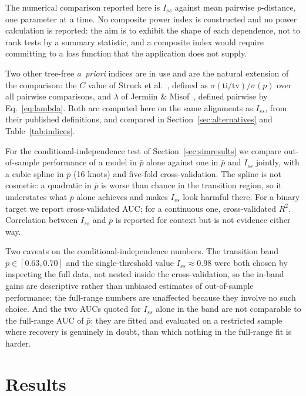 \documentclass[preprint,12pt,authoryear]{elsarticle}
\newcommand{\Iss}{I_{ss}}
\theoremstyle{definition}
\theoremstyle{remark}
\begin{document}
The numerical comparison reported here is $\Iss$ against mean pairwise
$p$-distance, one parameter at a time. No composite power index is
constructed and no power calculation is reported: the aim is to exhibit the
shape of each dependence, not to rank tests by a summary statistic, and a
composite index would require committing to a loss function that the
application does not supply.

Two other tree-free \emph{a~priori} indices are in use and are the natural
extension of the comparison: the $C$ value of
Struck et al.~\citep{struck2008cfactor}, defined as
$\sigma(\mathrm{ti/tv})/\sigma(p)$ over all pairwise comparisons, and
$\lambda$ of Jermiin \& Misof~\citep{jermiin2020signal}, defined pairwise by
Eq.~\eqref{eq:lambda}. Both are computed here on the same alignments as
$\Iss$, from their published definitions, and compared in
Section~\ref{sec:alternatives} and Table~\ref{tab:indices}.

For the conditional-independence test of Section~\ref{sec:simresults} we
compare out-of-sample performance of a model in $\bar p$ alone against one in
$\bar p$ and $\Iss$ jointly, with a cubic spline in $\bar p$ (16 knots) and
five-fold cross-validation. The spline is not cosmetic: a quadratic in
$\bar p$ is worse than chance in the transition region, so it understates what
$\bar p$ alone achieves and makes $\Iss$ look harmful there. For a binary
target we report cross-validated AUC; for a continuous one, cross-validated
$R^2$. Correlation between $\Iss$ and $\bar p$ is reported for context but is
not evidence either way.

Two caveats on the conditional-independence numbers. The transition band
$\bar p\in[0.63,0.70]$ and the single-threshold value $\Iss\approx0.98$ were
both chosen by inspecting the full data, not nested inside the
cross-validation, so the in-band gains are descriptive rather than unbiased
estimates of out-of-sample performance; the full-range numbers are unaffected
because they involve no such choice. And the two AUCs quoted for $\Iss$ alone
in the band are not comparable to the full-range AUC of $\bar p$: they are
fitted and evaluated on a restricted sample where recovery is genuinely in
doubt, than which nothing in the full-range fit is harder.


\section{Results}
\end{document}
